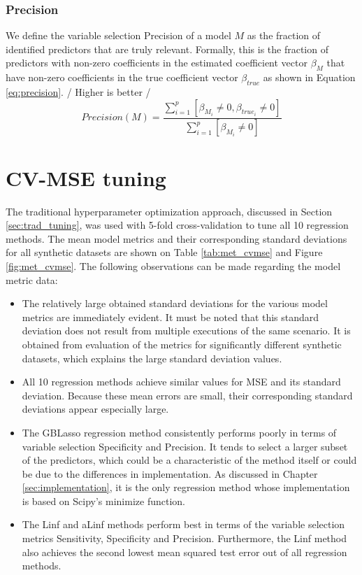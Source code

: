 \subsubsection{Precision}
We define the variable selection Precision of a model $M$ as the fraction of identified predictors that are truly relevant. Formally, this is the fraction of predictors with non-zero coefficients in the estimated coefficient vector $\beta_M$ that have non-zero coefficients in the true coefficient vector $\beta_{true}$ as shown in Equation \ref{eq:precision}. / Higher is better /
\begin{equation} \label{eq:precision}
Precision(M) = \frac{\sum_{i=1}^{p}[\beta_{M_i} \ne 0, \beta_{true_i} \ne 0]}{\sum_{i=1}^{p}[\beta_{M_i} \ne 0]}
\end{equation}


\section{CV-MSE tuning} \label{sec:disc_cvmse_tun}
The traditional hyperparameter optimization approach, discussed in Section \ref{sec:trad_tuning}, was used with 5-fold cross-validation to tune all 10 regression methods. The mean model metrics and their corresponding standard deviations for all synthetic datasets are shown on Table \ref{tab:met_cvmse} and Figure \ref{fig:met_cvmse}. The following observations can be made regarding the model metric data:

\begin{itemize}
	\item The relatively large obtained standard deviations for the various model metrics are immediately evident. It must be noted that this standard deviation does not result from multiple executions of the same scenario. It is obtained from evaluation of the metrics for significantly different synthetic datasets, which explains the large standard deviation values. 
	\item All 10 regression methods achieve similar values for MSE and its standard deviation. Because these mean  errors are small, their corresponding standard deviations appear especially large. 
	\item The GBLasso regression method consistently performs poorly in terms of variable selection Specificity and Precision. It tends to select a larger subset of the predictors, which could be a characteristic of the method itself or could be due to the differences in implementation. As discussed in Chapter \ref{sec:implementation}, it is the only regression method whose implementation is based on Scipy's minimize function.
	\item The Linf and aLinf methods perform best in terms of the variable selection metrics Sensitivity, Specificity and Precision. Furthermore, the Linf method also achieves the second lowest mean squared test error out of all regression methods.
\end{itemize}

